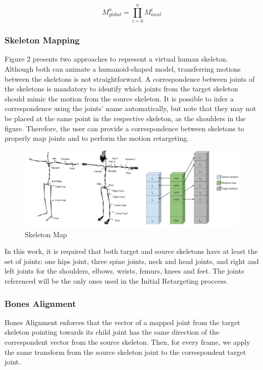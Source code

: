 \documentclass{vgtc}
\makeatletter
\def\maxwidth{\ifdim\Gin@nat@width>\linewidth\linewidth
    \else\Gin@nat@width\fi}
\let\Oldincludegraphics\includegraphics
\renewcommand{\includegraphics}[1]{\Oldincludegraphics[width=.8\maxwidth]{#1}}
\makeatother
\begin{document}
\begin{equation}
\label{eq:transformmatrixglobal}
M_{global}^{n} = \prod_{i=0}^{n} M_{local}^{i}
\end{equation}

    \subsubsection{Skeleton Mapping}\label{skeleton-mapping}

Figure 2 presents two approaches to represent a virtual human skeleton.
Although both can animate a humanoid-shaped model, transferring motions
between the skeletons is not straightforward. A correspondence between
joints of the skeletons is mandatory to identify which joints from the
target skeleton should mimic the motion from the source skeleton. It is
possible to infer a correspondence using the joints' name automatically,
but note that they may not be placed at the same point in the respective
skeleton, as the shoulders in the figure. Therefore, the user can
provide a correspondence between skeletons to properly map joints and to
perform the motion retargeting\cite{hsieh}.

\begin{figure}
\centering
\includegraphics{../figures/skelmap.png}
\caption{Skeleton Map}
\end{figure}

In this work, it is required that both target and source skeletons have
at least the set of joints: one hips joint, three spine joints, neck and
head joints, and right and left joints for the shoulders, elbows,
wrists, femurs, knees and feet. The joints referenced will be the only
ones used in the Initial Retargeting proccess.

\subsubsection{Bones Alignment}\label{bones-alignment}

Bones Alignment enforces that the vector of a mapped joint from the
target skeleton pointing towards its child joint has the same direction
of the correspondent vector from the source skeleton. Then, for every
frame, we apply the same transform from the source skeleton joint to the
correspondent target joint.
\end{document}
